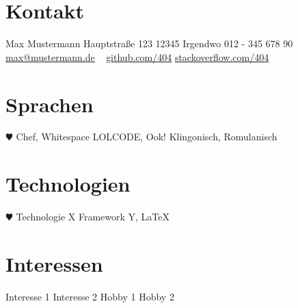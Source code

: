 \documentclass{documentclass/cv}
\begin{document}
        \begin{rside}
                \section{Kontakt}
                Max Mustermann
                Hauptstraße 123
                12345 Irgendwo
                012 - 345 678 90
                \url{max@mustermann.de}
                ~
                \url{github.com/404}
                \url{stackoverflow.com/404}
                \section{Sprachen}
                {\color{lightgray}$\varheart$} Chef, Whitespace
                LOLCODE, Ook!
                Klingonisch, Romulanisch
                \section{Technologien}
                {\color{lightgray}$\varheart$} Technologie X
                Framework Y, \LaTeX
                \section{Interessen}
                Interesse 1
                Interesse 2
                Hobby 1
                Hobby 2
        \end{rside}
\end{document}
